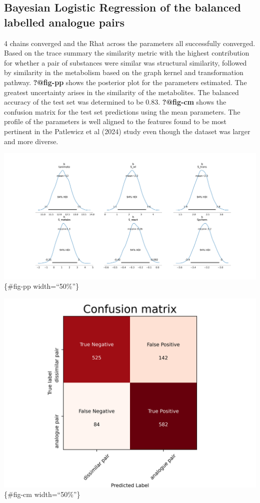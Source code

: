 \documentclass[
  super,
  preprint,
  3p]{elsarticle}
\begin{document}
\subsection{Bayesian Logistic Regression of the balanced labelled
analogue
pairs}\label{bayesian-logistic-regression-of-the-balanced-labelled-analogue-pairs}

4 chains converged and the Rhat across the parameters all successfully
converged. Based on the trace summary the similarity metric with the
highest contribution for whether a pair of substances were similar was
structural similarity, followed by similarity in the metabolism based on
the graph kernel and transformation pathway. \textbf{?@fig-pp} shows the
posterior plot for the parameters estimated. The greatest uncertainty
arises in the similarity of the metabolites. The balanced accuracy of
the test set was determined to be 0.83. \textbf{?@fig-cm} shows the
confusion matrix for the test set predictions using the mean parameters.
The profile of the parameters is well aligned to the features found to
be most pertinent in the Patlewicz et al (2024) study even though the
dataset was larger and more diverse.

\includegraphics{posterior_plot.png} \{\#fig-pp width=``50\%''\}

\includegraphics{confusion_matrix.png} \{\#fig-cm width=``50\%''\}
\end{document}
